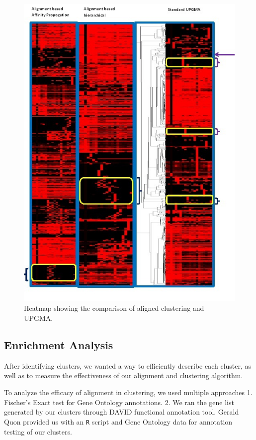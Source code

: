\documentclass[aps,prd,final,onecolumn,a4paper,10pt]{revtex4}
\begin{document}
\begin{figure}[H]
\centering
\includegraphics[scale=0.75]{ClustercomparisonResults_v2.png}
\caption{Heatmap showing the comparison of aligned clustering and UPGMA.}
\label{fig:ClusterComparison}
\end{figure}


\subsection{Enrichment Analysis}
After identifying clusters, we wanted a way to efficiently describe each cluster, as well as to measure the effectiveness of our alignment and clustering algorithm.

To analyze the efficacy of alignment in clustering, we used multiple approaches 1. Fischer's Exact test for Gene Ontology annotations. 2. We ran the gene list generated by our clusters through DAVID functional annotation tool.
Gerald Quon provided us with an \verb!R! script and Gene Ontology data for annotation testing of our clusters.
\end{document}
